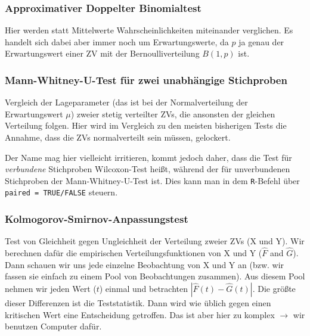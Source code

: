 \documentclass[a4paper]{article}
\newcommand\dangersign[1][2ex]{%
  \renewcommand\stacktype{L}%
  \scaleto{\stackon[1.3pt]{\color{red}$\triangle$}{\tiny !}}{#1}%
}
\begin{document}
\noindent {}

\subsubsection{Approximativer Doppelter Binomialtest}\label{sec:bintest2}
Hier werden statt Mittelwerte Wahrscheinlichkeiten miteinander verglichen. Es handelt sich dabei aber immer noch um Erwartungswerte, da $p$ ja genau der Erwartungswert einer ZV mit der Bernoulliverteilung $B(1,p)$ ist.

\subsubsection{Mann-Whitney-U-Test für zwei unabhängige Stichproben}\label{sec:MWUtest}
Vergleich der Lageparameter (das ist bei der Normalverteilung der Erwartungswert $\mu$) zweier stetig verteilter ZVs, die ansonsten der gleichen Verteilung folgen. Hier wird im Vergleich zu den meisten bisherigen Tests die Annahme, dass die ZVs normalverteilt sein müssen, gelockert.\\

\noindent {}

\noindent \dangersign[3ex] Der Name mag hier vielleicht irritieren, kommt jedoch daher, dass die Test für \textit{verbundene} Stichproben Wilcoxon-Test heißt, während der für unverbundenen Stichproben der Mann-Whitney-U-Test ist. Dies kann man in dem \texttt{R}-Befehl über \texttt{paired = TRUE/FALSE} steuern.

\subsubsection{Kolmogorov-Smirnov-Anpassungstest}\label{sec:KolSmi}
Test von Gleichheit gegen Ungleichheit der Verteilung zweier ZVs (X und Y). Wir berechnen dafür die empirischen Verteilungsfunktionen von X und Y ($\hat{F}$ and $\hat{G}$). Dann schauen wir uns jede einzelne Beobachtung von X und Y an (bzw. wir fassen sie einfach zu einem Pool von Beobachtungen zusammen). Aus diesem Pool nehmen wir jeden Wert ($t$) einmal und betrachten $|\hat{F}(t)-\hat{G}(t)|$. Die größte dieser Differenzen ist die Teststatistik. Dann wird wie üblich gegen einen kritischen Wert eine Entscheidung getroffen. Das ist aber hier zu komplex $\rightarrow$ wir benutzen Computer dafür.\\
\end{document}
